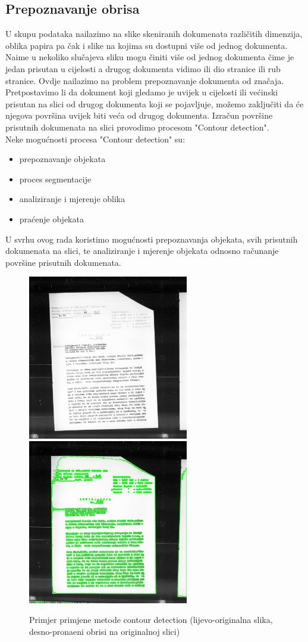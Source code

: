 \documentclass[times, utf8, zavrsni, numeric]{fer}
\begin{document}
\subsection{Prepoznavanje obrisa}
U skupu podataka nailazimo na slike skeniranih dokumenata različitih dimenzija, oblika papira pa čak i slike na kojima su dostupni više od jednog dokumenta. Naime u nekoliko slučajeva sliku mogu činiti više od jednog dokumenta čime je jedan prisutan u cijelosti a drugog dokumenta vidimo ili dio stranice ili rub stranice. Ovdje nailazimo na problem prepoznavanje dokumenta od značaja. Pretpostavimo li da dokument koji gledamo je uvijek u cijelosti ili većinski prisutan na slici od drugog dokumenta koji se pojavljuje, možemo zaključiti da će njegova površina uvijek biti veća od drugog dokumenta. Izračun površine prisutnih dokumenata na slici provodimo procesom "Contour detection"\cite{contour}. 
\\
\hfill \break
Neke mogućnosti procesa "Contour detection" su:
\begin{itemize}
  \item prepoznavanje objekata
  \item proces segmentacije 
  \item analiziranje i mjerenje oblika
  \item praćenje objekata
\end{itemize}
\hfill \break
U svrhu ovog rada koristimo mogućnosti prepoznavanja objekata, svih prisutnih dokumenata na slici, te analiziranje i mjerenje objekata odnosno računanje površine prisutnih dokumenata.
\begin{figure}[H]
\centering
    \includegraphics[width=7cm]{images/vise papira na jednoj slici.jpg}
    \includegraphics[width=7cm]{images/vise kontura nacrtane.jpg}
    \caption{Primjer primjene metode contour detection (lijevo-originalna slika, desno-pronaeni obrisi na originalnoj slici)}
	\label{fig:example_deskewed}
\end{figure}
\end{document}
